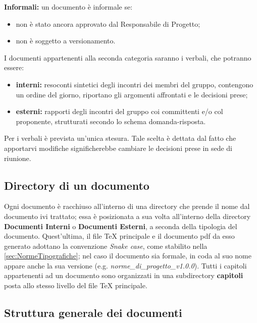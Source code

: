  \textbf{Informali:} un documento è informale se:
\begin{itemize}
\item non è stato ancora approvato dal Responsabile di Progetto;
	\item non è soggetto a versionamento.
\end{itemize}
I documenti appartenenti alla seconda categoria saranno i verbali, che potranno
essere:
\begin{itemize}
\item \textbf{interni:} resoconti sintetici degli incontri dei membri del gruppo, contengono un ordine del giorno, riportano gli argomenti affrontati e le decisioni prese;
	\item \textbf{esterni:} rapporti degli incontri del gruppo coi committenti e/o col proponente, strutturati secondo lo schema domanda-risposta.
\end{itemize}
Per i verbali è prevista un’unica stesura. Tale scelta è dettata dal fatto che apportarvi modifiche significherebbe cambiare le decisioni prese in sede di riunione.
\subsection{Directory di un documento}
Ogni documento è racchiuso all'interno di una directory che prende il nome dal documento ivi trattato; essa è posizionata a sua volta all'interno della directory \textbf{Documenti Interni} o \textbf{Documenti Esterni}, a seconda della tipologia del documento. Quest'ultima, il file \TeX{} principale e il documento pdf da esso generato adottano la convenzione \textit{Snake case}, come stabilito nella \autoref{sec:NormeTipografiche}; nel caso il documento sia formale, in coda al suo nome appare anche la sua versione (e.g. \textit{norme\_di\_progetto\_v1.0.0}).
Tutti i capitoli appartenenti ad un documento sono organizzati in una subdirectory \textbf{capitoli} posta allo stesso livello del file \TeX{} principale.
\subsection{Struttura generale dei documenti}
